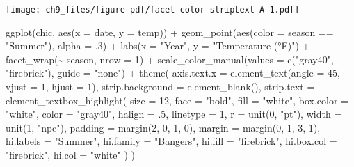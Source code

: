 \documentclass[
  letterpaper,
]{scrbook}
\newenvironment{Shaded}{\begin{snugshade}}{\end{snugshade}}
\newcommand{\AttributeTok}[1]{\textcolor[rgb]{0.40,0.45,0.13}{#1}}
\newcommand{\DecValTok}[1]{\textcolor[rgb]{0.68,0.00,0.00}{#1}}
\newcommand{\FunctionTok}[1]{\textcolor[rgb]{0.28,0.35,0.67}{#1}}
\newcommand{\NormalTok}[1]{\textcolor[rgb]{0.00,0.23,0.31}{#1}}
\newcommand{\SpecialCharTok}[1]{\textcolor[rgb]{0.37,0.37,0.37}{#1}}
\newcommand{\StringTok}[1]{\textcolor[rgb]{0.13,0.47,0.30}{#1}}
\begin{document}
\texttt{[image: ch9\_files/figure-pdf/facet-color-striptext-A-1.pdf]}

\begin{Shaded}
\begin{Highlighting}[]
\FunctionTok{ggplot}\NormalTok{(chic, }\FunctionTok{aes}\NormalTok{(}\AttributeTok{x =}\NormalTok{ date, }\AttributeTok{y =}\NormalTok{ temp)) }\SpecialCharTok{+}
  \FunctionTok{geom\_point}\NormalTok{(}\FunctionTok{aes}\NormalTok{(}\AttributeTok{color =}\NormalTok{ season }\SpecialCharTok{==} \StringTok{"Summer"}\NormalTok{), }\AttributeTok{alpha =}\NormalTok{ .}\DecValTok{3}\NormalTok{) }\SpecialCharTok{+}
  \FunctionTok{labs}\NormalTok{(}\AttributeTok{x =} \StringTok{"Year"}\NormalTok{, }\AttributeTok{y =} \StringTok{"Temperature (°F)"}\NormalTok{) }\SpecialCharTok{+}
  \FunctionTok{facet\_wrap}\NormalTok{(}\SpecialCharTok{\textasciitilde{}}\NormalTok{ season, }\AttributeTok{nrow =} \DecValTok{1}\NormalTok{) }\SpecialCharTok{+}
  \FunctionTok{scale\_color\_manual}\NormalTok{(}\AttributeTok{values =} \FunctionTok{c}\NormalTok{(}\StringTok{"gray40"}\NormalTok{, }\StringTok{"firebrick"}\NormalTok{), }\AttributeTok{guide =} \StringTok{"none"}\NormalTok{) }\SpecialCharTok{+}
  \FunctionTok{theme}\NormalTok{(}
    \AttributeTok{axis.text.x =} \FunctionTok{element\_text}\NormalTok{(}\AttributeTok{angle =} \DecValTok{45}\NormalTok{, }\AttributeTok{vjust =} \DecValTok{1}\NormalTok{, }\AttributeTok{hjust =} \DecValTok{1}\NormalTok{),}
    \AttributeTok{strip.background =} \FunctionTok{element\_blank}\NormalTok{(),}
    \AttributeTok{strip.text =} \FunctionTok{element\_textbox\_highlight}\NormalTok{(}
      \AttributeTok{size =} \DecValTok{12}\NormalTok{, }\AttributeTok{face =} \StringTok{"bold"}\NormalTok{,}
      \AttributeTok{fill =} \StringTok{"white"}\NormalTok{, }\AttributeTok{box.color =} \StringTok{"white"}\NormalTok{, }\AttributeTok{color =} \StringTok{"gray40"}\NormalTok{,}
      \AttributeTok{halign =}\NormalTok{ .}\DecValTok{5}\NormalTok{, }\AttributeTok{linetype =} \DecValTok{1}\NormalTok{, }\AttributeTok{r =} \FunctionTok{unit}\NormalTok{(}\DecValTok{0}\NormalTok{, }\StringTok{"pt"}\NormalTok{), }\AttributeTok{width =} \FunctionTok{unit}\NormalTok{(}\DecValTok{1}\NormalTok{, }\StringTok{"npc"}\NormalTok{),}
      \AttributeTok{padding =} \FunctionTok{margin}\NormalTok{(}\DecValTok{2}\NormalTok{, }\DecValTok{0}\NormalTok{, }\DecValTok{1}\NormalTok{, }\DecValTok{0}\NormalTok{), }\AttributeTok{margin =} \FunctionTok{margin}\NormalTok{(}\DecValTok{0}\NormalTok{, }\DecValTok{1}\NormalTok{, }\DecValTok{3}\NormalTok{, }\DecValTok{1}\NormalTok{),}
      \AttributeTok{hi.labels =} \StringTok{"Summer"}\NormalTok{, }\AttributeTok{hi.family =} \StringTok{"Bangers"}\NormalTok{,}
      \AttributeTok{hi.fill =} \StringTok{"firebrick"}\NormalTok{, }\AttributeTok{hi.box.col =} \StringTok{"firebrick"}\NormalTok{, }\AttributeTok{hi.col =} \StringTok{"white"}
\NormalTok{    )}
\NormalTok{  )}
\end{Highlighting}
\end{Shaded}
\end{document}
